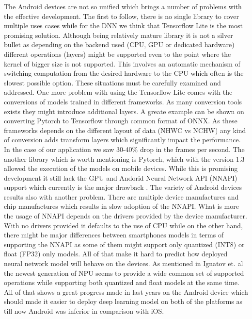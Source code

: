\documentclass[a4paper,conference]{IEEEtran}
\begin{document}
The Android devices are not so unified which brings a number of problems with the effective development. The first to follow, there is no single library to cover multiple uses cases while for the DNN we think that Tensorflow Lite is the most promising solution. Although being relatively  mature library it is not a silver bullet as depending on the backend used (CPU, GPU or dedicated hardware) different operations (layers) might be supported even to the point where the kernel of bigger size is not supported. This involves an automatic mechanism of switching computation from the desired hardware to the CPU which often is the slowest possible option. These situations must be carefully examined and addressed. One more problem with using the Tensorflow Lite comes with the conversions of models trained in different frameworks. As many conversion tools exists they might introduce additional layers. A greate example can be shown on converting Pytorch to Tensorflow through common format of ONNX. As these frameworks depends on the different layout of data (NHWC vs NCHW) any kind of conversion adds transform layers which significantly impact the performance. In the case of our application we saw 30-40\% drop in the frames per second.
The another library which is worth mentioning is Pytorch, which with the version 1.3 allowed the execution of the models on mobile devices. While this is promising development it still lack the GPU and Andorid Neural Network API (NNAPI) support which currently is the major drawback . The variety of Android devices results also with another problem. There are multiple device manufactures and chip manufactures which results in slow adoption of the NNAPI. What is more the usage of NNAPI depends on the drivers provided by the device manufacturer. With no drivers provided it defaults to the use of CPU while on the other hand, there might be major differences between smartphones models in terms of supporting the NNAPI as some of them might support only quantized (INT8) or float (FP32) only models. All of that make it hard to predict how deployed neural network model will behave on the devices. As mentioned in Ignatov et. al\cite{aiMobileBenchmark} the newest generation of NPU seems to provide a wide common set of supported operations while supporting both quantized and float models at the same time. All of that shows a great progress made in last years on the Android device which should made it easier to deploy deep learning model on both of the platforms as till now Android was inferior in comparison with iOS.
\end{document}
